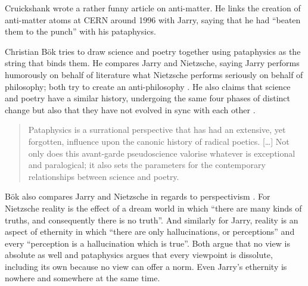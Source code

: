 Cruickshank \autocite*{Cruickshank} wrote a rather funny article on anti-matter. He links the creation of anti-matter atoms at CERN around 1996 with Jarry, saying that he had ``beaten them to the punch'' with his pataphysics.

Christian Bök \autocite*{Bok2002} tries to draw science and poetry together using pataphysics as the string that binds them. He compares Jarry and Nietzsche, saying Jarry performs humorously on behalf of literature what Nietzsche performs seriously on behalf of philosophy; both try to create an anti-philosophy \autocite[p.9]{Bok2002}. He also claims that science and poetry have a similar history, undergoing the same four phases of distinct change but also that they have not evolved in sync with each other \autocite[p.15]{Bok2002}.


\begin{quotation}
  Pataphysics is a surrational perspective that has had an extensive, yet forgotten, influence upon the canonic history of radical poetics. […] Not only does this avant-garde pseudoscience valorise whatever is exceptional and paralogical; it also sets the parameters for the contemporary relationships between science and poetry. 
\end{quotation}

Bök also compares Jarry and Nietzsche in regards to perspectivism \citeyear[p.31]{Bok2002}. For Nietzsche reality is the effect of a dream world in which ``there are many kinds of truths, and consequently there is no truth''. And similarly for Jarry, reality is an aspect of ethernity in which ``there are only hallucinations, or perceptions'' and every ``perception is a hallucination which is true''. Both argue that no view is absolute as well and pataphysics argues that every viewpoint is dissolute, including its own because no view can offer a norm. Even Jarry's ethernity is nowhere and somewhere at the same time.

